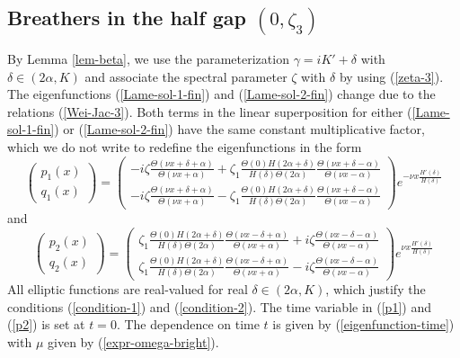 \documentclass[12pt,reqno]{amsart}
\numberwithin{equation}{section}
\begin{document}
\subsection{Breathers in the half gap $(0,\zeta_3)$}
\label{sec-4-1}

By Lemma \ref{lem-beta}, we use the parameterization $\gamma = i K' + \delta$ with $\delta \in (2 \alpha,K)$ and associate the spectral parameter $\zeta$ 
with $\delta$ by using (\ref{zeta-3}). The eigenfunctions (\ref{Lame-sol-1-fin}) and (\ref{Lame-sol-2-fin}) change due to the relations (\ref{Wei-Jac-3}). Both terms in the linear superposition for either (\ref{Lame-sol-1-fin}) or (\ref{Lame-sol-2-fin}) have the same constant multiplicative factor, which we do not write to redefine the eigenfunctions in the form 
\begin{equation}
\label{p1}
\left( \begin{matrix} p_1(x) \\ q_1(x) \end{matrix} \right) = 
\left( \begin{matrix} -i\zeta\frac{\Theta(\nu x + \delta + \alpha)}{\Theta(\nu x + \alpha)} + \zeta_1 \frac{\Theta(0) H(2\alpha + \delta)}{H(\delta) \Theta(2\alpha)} \frac{\Theta(\nu x + \delta - \alpha)}{\Theta(\nu x - \alpha)} \\
-i\zeta\frac{\Theta(\nu x + \delta + \alpha)}{\Theta(\nu x + \alpha)} - \zeta_1 \frac{\Theta(0) H(2\alpha + \delta)}{H(\delta) \Theta(2\alpha)} \frac{\Theta(\nu x + \delta - \alpha)}{\Theta(\nu x - \alpha)} \end{matrix} \right)
e^{-\nu x \frac{H'(\delta)}{H(\delta)}}
\end{equation}
and 
\begin{equation}
\label{p2}
\left( \begin{matrix} p_2(x) \\ q_2(x) \end{matrix} \right) = 
\left( \begin{matrix} \zeta_1 \frac{\Theta(0) H(2\alpha + \delta)}{H(\delta) \Theta(2\alpha)}\frac{\Theta(\nu x - \delta + \alpha)}{\Theta(\nu x + \alpha)} +  i\zeta \frac{\Theta(\nu x - \delta - \alpha)}{\Theta(\nu x - \alpha)} \\
\zeta_1 \frac{\Theta(0) H(2\alpha + \delta)}{H(\delta) \Theta(2\alpha)}\frac{\Theta(\nu x - \delta + \alpha)}{\Theta(\nu x + \alpha)} -  i\zeta \frac{\Theta(\nu x - \delta - \alpha)}{\Theta(\nu x - \alpha)} 
\end{matrix} \right)  e^{\nu x \frac{H'(\delta)}{H(\delta)}}
\end{equation}
All elliptic functions are real-valued for real $\delta \in (2 \alpha,K)$, 
which justify the conditions (\ref{condition-1}) and (\ref{condition-2}). 
The time variable in (\ref{p1}) and (\ref{p2}) is set at $t = 0$. The dependence on time $t$ is given by (\ref{eigenfunction-time}) with $\mu$ given by (\ref{expr-omega-bright}). 
\end{document}
